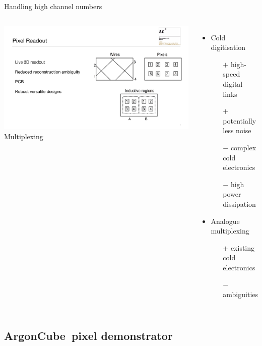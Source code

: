 \documentclass[]{beamer}
\newcommand*{\emphcol}{blue}
\newcommand*{\AC}{{ArgonCube}}
\begin{document}
\begin{frame}{Handling high channel numbers}
	\begin{columns}[c]
		\centering
		\includegraphics[page=1, viewport=930 90 1850 800, clip, width=\textwidth]{defence/Pixels}\\
		Multiplexing
		\begin{itemize}
			\item Cold digitisation
			\begin{itemize}
				\item[$+$] high-speed digital links
				\item[$+$] potentially less noise
				\item[$-$] complex cold electronics
				\item[$-$] high power dissipation
			\end{itemize}
			\item {\color{\emphcol} Analogue multiplexing}
			\begin{itemize}
				\item[$+$] existing cold electronics
				\item[$-$] ambiguities
			\end{itemize}
		\end{itemize}
	\end{columns}
\end{frame}

\subsection{\AC\ pixel demonstrator}
\end{document}
